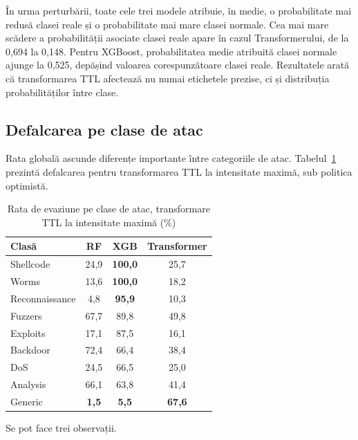 În urma perturbării, toate cele trei modele atribuie, în medie, o probabilitate mai redusă clasei reale și o probabilitate mai mare clasei normale. Cea mai mare scădere a probabilității asociate clasei reale apare în cazul Transformerului, de la 0,694 la 0,148. Pentru XGBoost, probabilitatea medie atribuită clasei normale ajunge la 0,525, depășind valoarea corespunzătoare clasei reale. Rezultatele arată că transformarea TTL afectează nu numai etichetele prezise, ci și distribuția probabilităților între clase.
\subsection{Defalcarea pe clase de atac}\label{subsec:perclasa-evaziune}

Rata globală ascunde diferențe importante între categoriile de atac. Tabelul~\ref{tab:evaziune-clase} prezintă defalcarea pentru transformarea TTL la intensitate maximă, sub politica optimistă.

\begin{table}[!ht]
    \caption{Rata de evaziune pe clase de atac, transformare TTL la intensitate maximă (\%)}
    \centering
    \begin{tabular}{|l|c|c|c|}
        \hline
        \textbf{Clasă} & \textbf{RF} & \textbf{XGB} & \textbf{Transformer} \\
        \hline
        Shellcode & 24,9 & \textbf{100,0} & 25,7 \\
        \hline
        Worms & 13,6 & \textbf{100,0} & 18,2 \\
        \hline
        Reconnaissance & 4,8 & \textbf{95,9} & 10,3 \\
        \hline
        Fuzzers & 67,7 & 89,8 & 49,8 \\
        \hline
        Exploits & 17,1 & 87,5 & 16,1 \\
        \hline
        Backdoor & 72,4 & 66,4 & 38,4 \\
        \hline
        DoS & 24,5 & 66,5 & 25,0 \\
        \hline
        Analysis & 66,1 & 63,8 & 41,4 \\
        \hline
        Generic & \textbf{1,5} & \textbf{5,5} & \textbf{67,6} \\
        \hline
    \end{tabular}
    \label{tab:evaziune-clase}
\end{table}

Se pot face trei observații.

